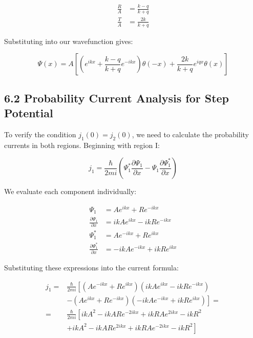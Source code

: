 \documentclass[italian]{HKNdocument}
\begin{document}
\begin{align*}
\frac{R}{A} & =\frac{k-q}{k+q} \\
\frac{T}{A} & =\frac{2 k}{k+q} \tag{6.17}
\end{align*}

Substituting into our wavefunction gives:

\begin{equation*}
\Psi(x)=A\left[\left(e^{i k x}+\frac{k-q}{k+q} e^{-i k x}\right) \theta(-x)+\frac{2 k}{k+q} e^{i q x} \theta(x)\right] \tag{6.18}
\end{equation*}


\subsection*{6.2 Probability Current Analysis for Step Potential}

To verify the condition $j_{1}(0)=j_{2}(0)$, we need to calculate the probability currents in both regions. Beginning with region I:

\begin{equation*}
j_{1}=\frac{\hbar}{2 m i}\left(\Psi_{1}^{*} \frac{\partial \Psi_{1}}{\partial x}-\Psi_{1} \frac{\partial \Psi_{1}^{*}}{\partial x}\right) \tag{6.19}
\end{equation*}

We evaluate each component individually:

\begin{align*}
\Psi_{1} & =A e^{i k x}+R e^{-i k x} \\
\frac{\partial \Psi_{1}}{\partial x} & =i k A e^{i k x}-i k R e^{-i k x} \\
\Psi_{1}^{*} & =A e^{-i k x}+R e^{i k x}  \tag{6.20}\\
\frac{\partial \Psi_{1}^{*}}{\partial x} & =-i k A e^{-i k x}+i k R e^{i k x}
\end{align*}

Substituting these expressions into the current formula:

\begin{align*}
j_{1}= & \frac{\hbar}{2 m i}\left[\left(A e^{-i k x}+R e^{i k x}\right)\left(i k A e^{i k x}-i k R e^{-i k x}\right)\right. \\
& \left.-\left(A e^{i k x}+R e^{-i k x}\right)\left(-i k A e^{-i k x}+i k R e^{i k x}\right)\right]= \\
= & \frac{\hbar}{2 m i}\left[i k A^{2}-i k A R e^{-2 i k x}+i k R A e^{2 i k x}-i k R^{2}\right.  \tag{6.21}\\
& \left.+i k A^{2}-i k A R e^{2 i k x}+i k R A e^{-2 i k x}-i k R^{2}\right]
\end{align*}
\end{document}
